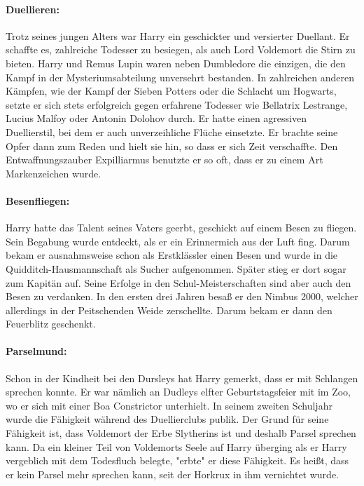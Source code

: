 \documentclass[a4paper, 10pt]{article}
\begin{document}
\paragraph{Duellieren:}
Trotz seines jungen Alters war Harry ein geschickter und versierter Duellant. Er schaffte es, zahlreiche Todesser zu besiegen, als auch Lord Voldemort die Stirn zu bieten. Harry und Remus Lupin waren neben Dumbledore die einzigen, die den Kampf in der Mysteriumsabteilung unversehrt bestanden. In zahlreichen anderen Kämpfen, wie der Kampf der Sieben Potters oder die Schlacht um Hogwarts, setzte er sich stets erfolgreich gegen erfahrene Todesser wie Bellatrix Lestrange, Lucius Malfoy oder Antonin Dolohov durch. Er hatte einen agressiven Duellierstil, bei dem er auch unverzeihliche Flüche einsetzte. Er brachte seine Opfer dann zum Reden und hielt sie hin, so dass er sich Zeit verschaffte. Den Entwaffnungszauber Expilliarmus benutzte er so oft, dass er zu einem Art Markenzeichen wurde.

\paragraph{Besenfliegen:}
Harry hatte das Talent seines Vaters geerbt, geschickt auf einem Besen zu fliegen. Sein Begabung wurde entdeckt, als er ein Erinnermich aus der Luft fing. Darum bekam er ausnahmsweise schon als Erstklässler einen Besen und wurde in die Quidditch-Hausmannschaft als Sucher aufgenommen. Später stieg er dort sogar zum Kapitän auf. Seine Erfolge in den Schul-Meisterschaften sind aber auch den Besen zu verdanken. In den ersten drei Jahren besaß er den Nimbus 2000, welcher allerdings in der Peitschenden Weide zerschellte. Darum bekam er dann den Feuerblitz geschenkt.

\paragraph{Parselmund:}
Schon in der Kindheit bei den Dursleys hat Harry gemerkt, dass er mit Schlangen sprechen konnte. Er war nämlich an Dudleys elfter Geburtstagsfeier mit im Zoo, wo er sich mit einer Boa Constrictor unterhielt. In seinem zweiten Schuljahr wurde die Fähigkeit während des Duellierclubs publik. Der Grund für seine Fähigkeit ist, dass Voldemort der Erbe Slytherins ist und deshalb Parsel sprechen kann. Da ein kleiner Teil von Voldemorts Seele auf Harry überging als er Harry vergeblich mit dem Todesfluch belegte, "erbte" er diese Fähigkeit. Es heißt, dass er kein Parsel mehr sprechen kann, seit der Horkrux in ihm vernichtet wurde.
\end{document}
